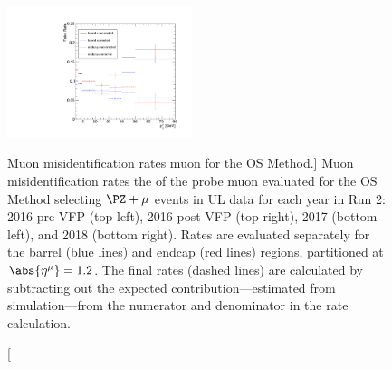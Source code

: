 \begin{figure}[!htbp]
\begin{center}
		\includegraphics[width=0.48\textwidth]{figures/higgsmassmeas/redbkg/fr/fakerates_UL2018_mu_yaxis_full.pdf}
		\caption
			[Muon misidentification rates \vs muon \pt for the OS Method.]
			{
			Muon misidentification rates \vs the \pt of the probe muon evaluated for the OS Method selecting $\PZ + \mu$ events in UL data
			for each year in Run 2:
			2016 pre-VFP (top left),
			2016 post-VFP (top right),
			2017 (bottom left), and
			2018 (bottom right).
			Rates are evaluated separately for the barrel (blue lines) and endcap (red lines) regions,
			partitioned at $\abs{\eta^{\mu}} = 1.2$.
			The final rates (dashed lines) are calculated by subtracting out the expected \WZ contribution---estimated from simulation---from the numerator and denominator in the rate calculation.
		}
		\label{fr_plots_mu}
	\end{center}
\end{figure}

